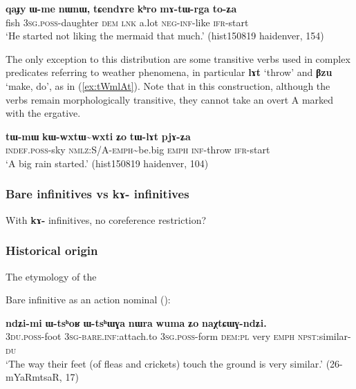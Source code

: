 \documentclass[oldfontcommands,oneside,a4paper,11pt]{article}
\newcommand{\ipa}[1]{\textbf{\phon#1}} %
\newcommand{\tld}{\textasciitilde{}}
\begin{document}
\begin{exe}
\ex  \label{ex:mAtWrga}
\gll \ipa{qaɟy} 	\ipa{ɯ-me} 	\ipa{nɯnɯ,} 	\ipa{tɕendɤre} 	\ipa{kʰro} 	\ipa{mɤ-tɯ-rga} 	\ipa{to-ʑa} \\
fish \textsc{3sg.poss}-daughter \textsc{dem} \textsc{lnk} a.lot \textsc{neg-inf}-like \textsc{ifr}-start \\
\glt `He started not liking the mermaid that much.' (hist150819 haidenver, 154)
\end{exe}
 
The only exception to this distribution are some transitive verbs used in complex predicates referring to weather phenomena, in particular \ipa{lɤt} `throw' and \ipa{βzu} `make, do', as in (\ref{ex:tWmlAt}). Note that in this construction, although the verbs remain morphologically transitive, they cannot take an overt A marked with the ergative.
 
\begin{exe}
\ex  \label{ex:tWmlAt}
\gll
\ipa{tɯ-mɯ} 	\ipa{kɯ-wxtɯ\tld{}wxti} 	\ipa{ʑo} 	\ipa{tɯ-lɤt} 	\ipa{pjɤ-ʑa} \\
\textsc{indef.poss}-sky \textsc{nmlz:S/A-emph}\tld{}be.big \textsc{emph} \textsc{inf}-throw \textsc{ifr}-start \\
\glt `A big rain started.' (hist150819 haidenver, 104)
\end{exe}



\subsubsection{Bare infinitives vs \ipa{kɤ-} infinitives}
With \ipa{kɤ-} infinitives, no coreference restriction?

\subsubsection{Historical origin}
The etymology of the 

Bare infinitive as an action nominal (\citealt{jacques14antipassive}):

\begin{exe}
\ex \label{ex:bare.inf.noun}
\gll \ipa{ndʑi-mi}   	\ipa{ɯ-tsʰoʁ}   	\ipa{ɯ-tsʰɯɣa}   	\ipa{nɯra}   	\ipa{wuma}   	\ipa{ʑo}   	\ipa{naχtɕɯɣ-ndʑi.}   \\
\textsc{3du.poss}-foot \textsc{3sg}-\textsc{bare.inf:}attach.to \textsc{3sg.poss}-form \textsc{dem:pl} very \textsc{emph}  \textsc{npst}:similar-\textsc{du}  \\
\glt `The way their feet (of fleas and crickets) touch the ground is very similar.' (26-mYaRmtsaR, 17)
\end{exe}
 
\end{document}
